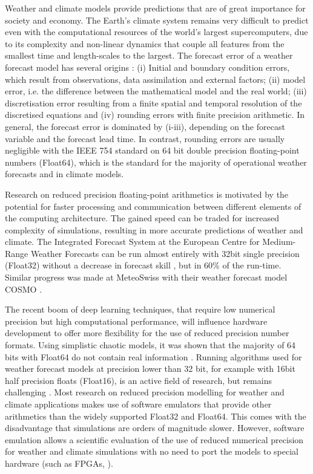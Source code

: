 \documentclass[draft]{agujournal2019}
\begin{document}
Weather and climate models provide predictions that are of great importance for society and economy. The Earth's climate system remains very difficult to predict even with the computational resources of the world's largest supercomputers, due to its complexity and non-linear dynamics that couple all features from the smallest time and length-scales to the largest. The forecast error of a weather forecast model has several origins \cite{Palmer2012a,Palmer2015}: (i) Initial and boundary condition errors, which result from observations, data assimilation and external factors; (ii) model error, i.e. the difference between the mathematical model and the real world; (iii) discretisation error resulting from a finite spatial and temporal resolution of the discretised equations and (iv) rounding errors with finite precision arithmetic. In general, the forecast error is dominated by (i-iii), depending on the forecast variable and the forecast lead time. In contrast, rounding errors are usually negligible with the IEEE 754 standard  \cite{IEEE} on 64 bit double precision floating-point numbers (Float64), which is the standard for the majority of operational weather forecasts and in climate models.

Research on reduced precision floating-point arithmetics is motivated by the potential for faster processing and communication between different elements of the computing architecture. The gained speed can be traded for increased complexity of simulations, resulting in more accurate predictions of weather and climate. The Integrated Forecast System at the European Centre for Medium-Range Weather Forecasts can be run almost entirely with 32bit single precision (Float32) without a decrease in forecast skill \cite{Vana2017}, but in 60\% of the run-time. Similar progress was made at MeteoSwiss with their weather forecast model COSMO \cite{Rudisuhli2013}. 

The recent boom of deep learning techniques, that require low numerical precision but high computational performance, will influence hardware development to offer more flexibility for the use of reduced precision number formats. Using simplistic chaotic models, it was shown that the majority of 64 bits with Float64 do not contain real information \cite{Jeffress2017}. Running algorithms used for weather forecast models at precision lower than 32 bit, for example with 16bit half precision floats (Float16), is an active field of research, but remains challenging \cite{Duben2014,Thornes2017,Hatfield2018,Duben2018}. Most research on reduced precision modelling for weather and climate applications makes use of software emulators \cite{Dawson2017} that provide other arithmetics than the widely supported Float32 and Float64. This comes with the disadvantage that simulations are orders of magnitude slower. However, software emulation allows a scientific evaluation of the use of reduced numerical precision for weather and climate simulations with no need to port the models to special hardware (such as FPGAs, \cite{Russell2017}).
 
\end{document}
